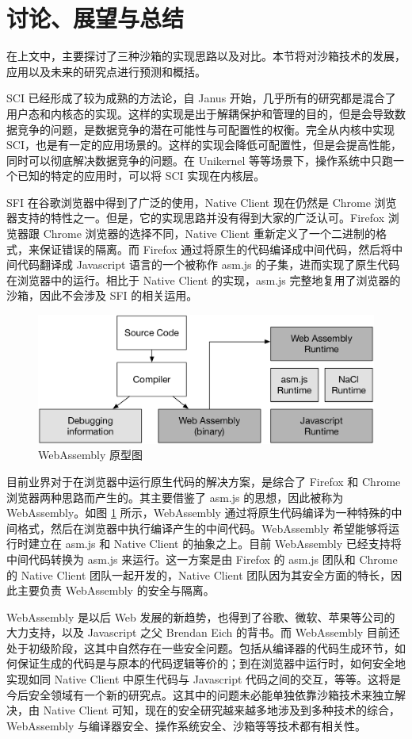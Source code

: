 \documentclass[final,5p,times]{elsarticle}
\begin{document}
\section{讨论、展望与总结}
\label{s:tucao}

在上文中，主要探讨了三种沙箱的实现思路以及对比。本节将对沙箱技术的发展，应用以及未来的研究点进行预测和概括。

SCI 已经形成了较为成熟的方法论，自 Janus 开始，几乎所有的研究都是混合了用户态和内核态的实现。这样的实现是出于解耦保护和管理的目的，但是会导致数据竞争的问题，是数据竞争的潜在可能性与可配置性的权衡。完全从内核中实现 SCI，也是有一定的应用场景的。这样的实现会降低可配置性，但是会提高性能，同时可以彻底解决数据竞争的问题。在 Unikernel 等等场景下，操作系统中只跑一个已知的特定的应用时，可以将 SCI 实现在内核层。

SFI 在谷歌浏览器中得到了广泛的使用，Native Client 现在仍然是 Chrome 浏览器支持的特性之一。但是，它的实现思路并没有得到大家的广泛认可。Firefox 浏览器跟 Chrome 浏览器的选择不同，Native Client 重新定义了一个二进制的格式，来保证错误的隔离。而 Firefox 通过将原生的代码编译成中间代码，然后将中间代码翻译成 Javascript 语言的一个被称作 asm.js 的子集，进而实现了原生代码在浏览器中的运行。相比于 Native Client 的实现，asm.js 完整地复用了浏览器的沙箱，因此不会涉及 SFI 的相关运用。

\begin{figure}
\centering
\includegraphics[width=0.7\linewidth]{imgs/wasm}
\caption{WebAssembly 原型图}
\label{fig:wasm}
\end{figure}

目前业界对于在浏览器中运行原生代码的解决方案，是综合了 Firefox 和 Chrome 浏览器两种思路而产生的。其主要借鉴了 asm.js 的思想，因此被称为 WebAssembly。如图 \ref{fig:wasm} 所示，WebAssembly 通过将原生代码编译为一种特殊的中间格式，然后在浏览器中执行编译产生的中间代码。WebAssembly 希望能够将运行时建立在 asm.js 和 Native Client 的抽象之上。目前 WebAssembly 已经支持将中间代码转换为 asm.js 来运行。这一方案是由 Firefox 的 asm.js 团队和 Chrome 的 Native Client 团队一起开发的，Native Client 团队因为其安全方面的特长，因此主要负责 WebAssembly 的安全与隔离。

WebAssembly 是以后 Web 发展的新趋势，也得到了谷歌、微软、苹果等公司的大力支持，以及 Javascript 之父 Brendan Eich 的背书。而 WebAssembly 目前还处于初级阶段，这其中自然存在一些安全问题。包括从编译器的代码生成环节，如何保证生成的代码是与原本的代码逻辑等价的；到在浏览器中运行时，如何安全地实现如同 Native Client 中原生代码与 Javascript 代码之间的交互，等等。这将是今后安全领域有一个新的研究点。这其中的问题未必能单独依靠沙箱技术来独立解决，由 Native Client 可知，现在的安全研究越来越多地涉及到多种技术的综合，WebAssembly 与编译器安全、操作系统安全、沙箱等等技术都有相关性。
\end{document}
